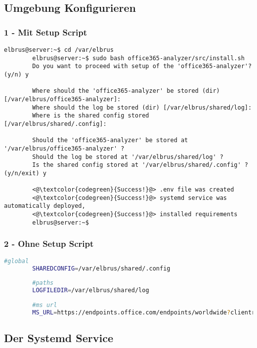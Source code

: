 	\subsection[file config]{Umgebung Konfigurieren}
	\subsubsection{1 - Mit Setup Script}
	
	\lstset{style=commands}
	\begin{lstlisting}[caption={Ausführen des 'install.sh' Scripts.}]
		elbrus@server:~$ cd /var/elbrus
		elbrus@server:~$ sudo bash office365-analyzer/src/install.sh
		Do you want to proceed with setup of the 'office365-analyzer'? (y/n) y
		
		Where should the 'office365-analyzer' be stored (dir) [/var/elbrus/office365-analyzer]:
		Where should the log be stored (dir) [/var/elbrus/shared/log]:
		Where is the shared config stored [/var/elbrus/shared/.config]:
		
		Should the 'office365-analyzer' be stored at '/var/elbrus/office365-analyzer' ?
		Should the log be stored at '/var/elbrus/shared/log' ?
		Is the shared config stored at '/var/elbrus/shared/.config' ? (y/n/exit) y
		
		<@\textcolor{codegreen}{Success!}@> .env file was created
		<@\textcolor{codegreen}{Success!}@> systemd service was automatically deployed,
		<@\textcolor{codegreen}{Success!}@> installed requirements
		elbrus@server:~$	
	\end{lstlisting}
	
	\subsubsection{2 - Ohne Setup Script}
	
	\lstset{style=files}
	\begin{lstlisting}[caption={Anhand von '.env.example' eigene '.env' Datei anlegen.}, language=bash]
		#global
		SHAREDCONFIG=/var/elbrus/shared/.config
		
		#paths
		LOGFILEDIR=/var/elbrus/shared/log
		
		#ms url
		MS_URL=https://endpoints.office.com/endpoints/worldwide?clientrequestid=b10c5ed1-bad1-445f-b386-b919946339a7
	\end{lstlisting}
	\newpage

	\subsection[systemd service]{Der Systemd Service}
	

